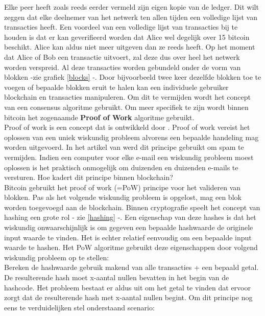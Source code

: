 Elke peer heeft zoals reeds eerder vermeld zijn eigen kopie van de ledger. Dit wilt zeggen dat elke deelnemer van het netwerk ten allen tijden een volledige lijst van transacties heeft. Een voordeel van een volledige lijst van transacties bij te houden is dat er kan geverifieerd worden dat Alice wel degelijk over 15 bitcoin beschikt. Alice kan aldus niet meer uitgeven dan ze reeds heeft. Op het moment dat Alice of Bob een transactie uitvoert, zal deze dus over heel het netwerk worden verspreid.  Al deze transacties worden gebundeld onder de vorm van blokken -zie grafiek \ref{blocks} -. Door bijvoorbeeld twee keer dezelfde blokken toe te voegen of bepaalde blokken eruit te halen kan een individuele gebruiker blockchain en transacties manipuleren.  Om dit te vermijden wordt het concept van een consensus algoritme gebruikt. Om meer specifiek te zijn wordt binnen bitcoin het zogenaamde \textbf{Proof of Work} algoritme gebruikt.\\

Proof of work is een concept dat is ontwikkeld door \textcite{Dwork}. Proof of work vereist het oplossen van een uniek wiskundig probleem alvorens een bepaalde handeling mag worden uitgevoerd. In het artikel van \textcite{Dwork} werd dit principe gebruikt om spam te vermijden. Indien een computer voor elke e-mail een wiskundig probleem moest oplossen is het praktisch onmogelijk om duizenden en duizenden e-mails te versturen. Hoe kadert dit principe binnen blockchain?\\

Bitcoin gebruikt het proof of work (=PoW) principe voor het valideren van blokken. Pas als het volgende wiskundig probleem is opgelost, mag een blok worden toegevoegd aan de blockchain. Binnen cryptografie speelt het concept van hashing een grote rol - zie \ref{hashing} -. Een eigenschap van deze hashes is dat het wiskundig onwaarschijnlijk is om gegeven een bepaalde hashwaarde de originele input waarde te vinden. Het is echter relatief eenvoudig om een bepaalde input waarde te hashen. Het PoW algoritme gebruikt deze eigenschappen door volgend wiskundig probleem op te stellen:\\

Bereken de hashwaarde gebruik makend van alle transacties + een bepaald getal. De resulterende hash moet x-aantal nullen bevatten in het begin van de hashcode. Het probleem bestaat er aldus uit om het getal te vinden dat ervoor zorgt dat de resulterende hash met x-aantal nullen begint.  Om dit principe nog eens te verduidelijken stel onderstaand scenario:\\

